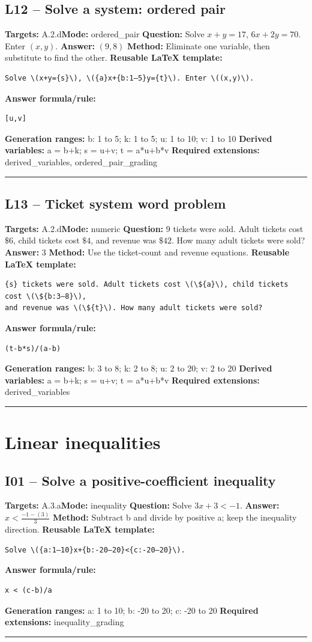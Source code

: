 \documentclass[11pt]{article}
\begin{document}
\subsection{L12 -- Solve a system: ordered pair}
\textbf{Targets:} A.2.d\quad\textbf{Mode:} ordered\_pair
\textbf{Question:} Solve \(x+y=17\), \(6x+2y=70\). Enter \((x,y)\).
\textbf{Answer:} \((9,8)\)
\textbf{Method:} Eliminate one variable, then substitute to find the other.
\textbf{Reusable LaTeX template:}
\begin{verbatim}
Solve \(x+y={s}\), \({a}x+{b:1–5}y={t}\). Enter \((x,y)\).
\end{verbatim}
\textbf{Answer formula/rule:}
\begin{verbatim}
[u,v]
\end{verbatim}
\textbf{Generation ranges:} b: 1 to 5; k: 1 to 5; u: 1 to 10; v: 1 to 10
\textbf{Derived variables:} a = b+k; s = u+v; t = a*u+b*v
\textbf{Required extensions:} derived\_variables, ordered\_pair\_grading
\medskip\hrule\medskip
\subsection{L13 -- Ticket system word problem}
\textbf{Targets:} A.2.d\quad\textbf{Mode:} numeric
\textbf{Question:} 9 tickets were sold. Adult tickets cost \(\$6\), child tickets cost \(\$4\), and revenue was \(\$42\). How many adult tickets were sold?
\textbf{Answer:} \(3\)
\textbf{Method:} Use the ticket-count and revenue equations.
\textbf{Reusable LaTeX template:}
\begin{verbatim}
{s} tickets were sold. Adult tickets cost \(\${a}\), child tickets cost \(\${b:3–8}\),
and revenue was \(\${t}\). How many adult tickets were sold?
\end{verbatim}
\textbf{Answer formula/rule:}
\begin{verbatim}
(t-b*s)/(a-b)
\end{verbatim}
\textbf{Generation ranges:} b: 3 to 8; k: 2 to 8; u: 2 to 20; v: 2 to 20
\textbf{Derived variables:} a = b+k; s = u+v; t = a*u+b*v
\textbf{Required extensions:} derived\_variables
\medskip\hrule\medskip
\section{Linear inequalities}
\subsection{I01 -- Solve a positive-coefficient inequality}
\textbf{Targets:} A.3.a\quad\textbf{Mode:} inequality
\textbf{Question:} Solve \(3x+3<-1\).
\textbf{Answer:} \(x<\frac{-1-(3)}{3}\)
\textbf{Method:} Subtract b and divide by positive a; keep the inequality direction.
\textbf{Reusable LaTeX template:}
\begin{verbatim}
Solve \({a:1–10}x+{b:-20–20}<{c:-20–20}\).
\end{verbatim}
\textbf{Answer formula/rule:}
\begin{verbatim}
x < (c-b)/a
\end{verbatim}
\textbf{Generation ranges:} a: 1 to 10; b: -20 to 20; c: -20 to 20
\textbf{Required extensions:} inequality\_grading
\medskip\hrule\medskip
\end{document}
